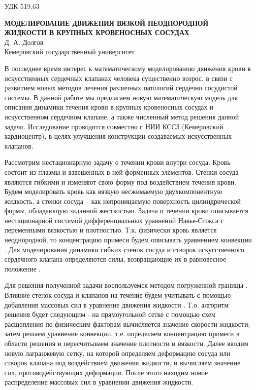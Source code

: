 \documentclass{article}
\begin{document}
\begin{flushright}
УДК 519.63    %
\end{flushright}

\begin{center}
\textbf{МОДЕЛИРОВАНИЕ ДВИЖЕНИЯ ВЯЗКОЙ НЕОДНОРОДНОЙ ЖИДКОСТИ В КРУПНЫХ КРОВЕНОСНЫХ СОСУДАХ}
\\
\vspace{\baselineskip}
Д. А. Долгов
\\
Кемеровский государственный университет
\end{center}
\vspace{\baselineskip}

В последнее время интерес к математическому моделированию движения крови в искусственных сердечных клапанах человека существенно возрос, в связи с развитием новых методов лечения различных патологий сердечно сосудистой системы. В данной работе мы предлагаем новую математическую модель для описания динамики течения крови в крупных кровеносных сосудах и искусственном сердечном клапане, а также численный метод решения данной задачи. Исследование проводится совместно с НИИ КССЗ (Кемеровский кардиоцентр), в целях улучшения конструкции создаваемых искусственных клапанов.

Рассмотрим нестационарную задачу о течении крови внутри сосуда. Кровь состоит из плазмы и взвешенных в ней форменных элементов. Стенки сосуда являются гибкими и изменяют свою форму под воздействием течения крови. Будем моделировать кровь как вязкую несжимаемую двухкомпонентную жидкость, а стенки сосуда – как непроницаемую поверхность цилиндрической формы, обладающую заданной жесткостью. Задача о течении крови описывается нестационарной системой дифференциальных уравнений Навье-Стокса \cite{zaharov_miloshevich} с переменными вязкостью и плотностью. Т.к. физически кровь является неоднородной, то концентрацию примеси будем описывать уравнением конвекции \cite{zaharov_miloshevich}. Для моделирования динамики гибких стенок сосуда и створок искусственного сердечного клапана определяются силы, возвращающие их в равновесное положение \cite{boyce}.

Для решения полученной задачи воспользуемся методом погруженной границы \cite{boyce}. Влияние стенок сосуда и клапанов на течение будем учитывать с помощью добавления массовых сил в уравнение движения жидкости \cite{boyce}. Т.о. алгоритм решения будет следующим - на прямоугольной сетке с помощью схем расщепления по физическим факторам вычисляется значение скорости жидкости; затем решаем уравнение конвекции, т.е. определяем концентрацию примеси в области решения и пересчитываем значение плотности и вязкости. Далее вводим новую лагранжевую сетку, на которой определяем деформацию сосуда или створок клапана под воздействием движения жидкости, и вычисляем значение сил, противодействующих деформации. После этого находим новое распределение массовых сил в уравнении движения жидкости.
\end{document}
